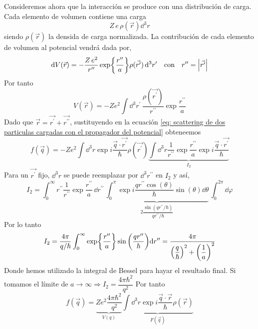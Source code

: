 Consideremos ahora que la interacción se produce con una distribución de carga. Cada elemento de volumen contiene una carga $$Z\,e\, \rho(\vec{r}) \dd^3r$$
siendo $\rho(\vec{r})$ la densida de carga normalizada. La contribución de cada elemento de volumen al potencial vendrá dada por,
\begin{equation}
    \dd V(\vec{r})=-\frac{Z\,e^2}{r^{\prime \prime}} \exp{\frac{r^{\prime \prime}}{a}} \rho(\vec{r^\prime})\, \dd^3r^\prime \quad \text{con}  \quad r^{\prime \prime}=\abs{\vec{r^\prime}}
\end{equation}
Por tanto 
\begin{equation}
    V(\vec{r})=-Ze^2\int \dd^3r^\prime \,\frac{\rho(\vec{r^\prime})}{r^{\prime \prime}} \exp{\frac{r^{\prime \prime}}{a}}
    \label{eq: Potencial con la distribucion de carga}
\end{equation}
Dado que $\vec{r}=\vec{r^\prime}+\vec{r^{\prime \prime}}$, sustituyendo en la ecuación \ref{eq: scattering de dos particulas cargadas con el propagador del potencial} obteneemos
\begin{equation}
    f(\vec{q})=-Ze^2\int \dd^3r \exp{i\frac{\vec{q}\cdot \vec{r^\prime}}{\hbar}} \rho(\vec{r^\prime}) \underbrace{\int \dd^3r \frac{1}{r^{\prime \prime}}\exp{\frac{r^{\prime \prime}}{a}}  \exp{i\frac{\vec{q}\cdot \vec{r^\prime}}{\hbar}}}_{I_2}
\end{equation}
Para un $\vec{r^\prime}$ fijo, $\dd^3r$ se puede reemplazar por $\dd^3r^{\prime \prime}$ en $I_2$ y así,
\begin{equation}
    I_2=\int^\infty_0 r^{\prime \prime } \frac{1}{r^{\prime \prime}}\exp{\frac{r^{\prime \prime}}{a}} \, \dd r^{\prime \prime}\,\underbrace{\int^\pi_0 \exp{i\frac{qr^{\prime \prime}\cos(\theta)}{\hbar}} \sin(\theta)\dd \theta }_{2\dfrac{\sin(qr^{\prime \prime}/\hbar)}{qr^{\prime \prime}/\hbar}}\,\int^{2\pi}_0 \dd \varphi
\end{equation}
Por lo tanto 
\begin{equation}
    I_2=\frac{4\pi}{q/\hbar} \int^\infty_0 \exp{\frac{r^{\prime \prime}}{a}} \sin\qty(\frac{qr^{\prime \prime}}{\hbar}) \dd r^{\prime \prime}=\frac{4\pi}{\qty(\dfrac{q}{\hbar})^2+\qty(\dfrac{1}{a})^2}
    \label{eq: transformada de fourier potencial de yukawa}
\end{equation}
Donde hemos utilizado la integral de Bessel para hayar el resultado final.
Si tomamos el límite de $a\xrightarrow[]{} \infty \Rightarrow I_2=\dfrac{4\pi \hbar^2}{q^2}$ 
Por tanto
\begin{equation}
    f(\vec{q})=\underbrace{Ze^2\dfrac{4\pi \hbar^2}{q^2}}_{V(q)} \underbrace{\int \dd^3r \exp{i\frac{\vec{q}\cdot \vec{r}}{\hbar}} \rho(\vec{r})}_{F(\vec{q})}
\end{equation}
